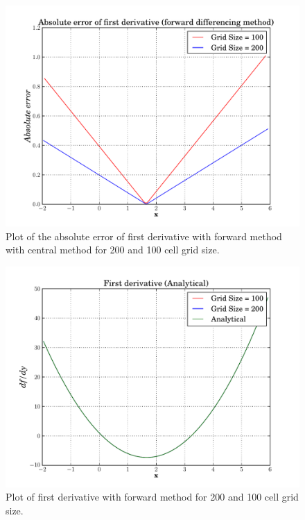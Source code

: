 \documentclass[10pt]{article}
\begin{document}
\begin{figure}[h]
  \begin{center}
    \includegraphics[totalheight=0.5\textheight]{plot2.pdf}
    \caption{\label{fig:CentralMethod} Plot of the absolute error of first derivative with forward method  with central method for 200 and 100 cell grid size.}
  \end{center}
\end{figure}

\begin{figure}[h]
  \begin{center}
    \includegraphics[totalheight=0.5\textheight]{plot3.pdf}
    \caption{\label{fig:ForwardMethoddf/dx} Plot of first derivative with forward method for 200 and 100 cell grid size.}
  \end{center}
\end{figure}
\end{document}
